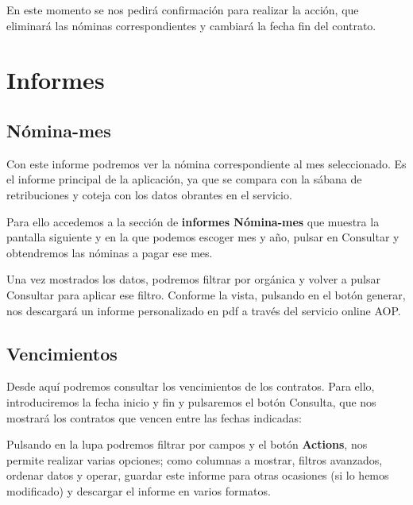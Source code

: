 
En este momento se nos pedirá confirmación para realizar la acción, que eliminará las nóminas correspondientes y cambiará la fecha fin del contrato.


\section{Informes}\label{informes}

\subsection{Nómina-mes}\label{nomina-mes}

Con este informe podremos ver la nómina correspondiente al mes seleccionado. Es el informe principal de la aplicación, ya que se compara con la sábana de retribuciones y coteja con los datos obrantes en el servicio.

Para ello accedemos a la sección de \textbf{informes Nómina-mes} que muestra la pantalla siguiente y en la que podemos escoger mes y año, pulsar en Consultar y obtendremos las nóminas a pagar ese mes.


Una vez mostrados los datos, podremos filtrar por orgánica y volver a pulsar Consultar para aplicar ese filtro.
Conforme la vista, pulsando en el botón generar, nos descargará un informe personalizado en pdf a través del servicio online \acrfull{AOP}.


\subsection{Vencimientos}\label{vencimientos}

Desde aquí podremos consultar los vencimientos de los contratos. Para ello, introduciremos la fecha inicio y fin y pulsaremos el botón Consulta, que nos mostrará los contratos que vencen entre las fechas indicadas:


Pulsando en la lupa podremos filtrar por campos y el botón \textbf{Actions}, nos permite realizar varias opciones; como columnas a mostrar, filtros avanzados, ordenar datos y operar, guardar este informe para otras ocasiones (si lo hemos modificado) y descargar el informe en varios formatos.

